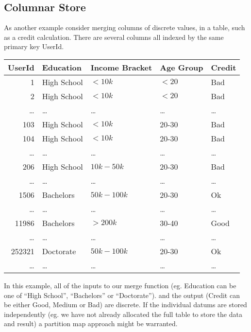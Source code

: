 \documentclass{article}
\begin{document}
\subsection{Columnar Store}

As another example consider merging columns of discrete values,
in a table,
such as a credit calculation.
There are several columns all indexed by the same primary key UserId.
\begin{center}
\begin{tabular}{|r|l|l|l|l|}
\hline
  UserId & Education   & Income Bracket & Age Group & Credit \\
\hline
  1      & High School & $<10k$       & $< 20$  & Bad    \\
  2      & High School & $<10k$       & $< 20$  & Bad    \\
  \ldots & \ldots      & \dots        & \ldots  & \ldots \\
  103    & High School & $<10k$       & 20-30   & Bad    \\
  104    & High School & $<10k$       & 20-30   & Bad    \\
  \ldots & \ldots      & \dots        & \ldots  & \ldots \\
  206    & High School & $10k-50k$    & 20-30   & Bad    \\
  \ldots & \ldots      & \dots        & \ldots  & \ldots \\
  1506   & Bachelors   & $50k-100k$   & 20-30   & Ok     \\
  \ldots & \ldots      & \dots        & \ldots  & \ldots \\
  11986  & Bachelors   & $>200k$      & 30-40   & Good \\
  \ldots & \ldots      & \dots        & \ldots  & \ldots \\
  252321 & Doctorate   & $50k-100k$   & 20-30   & Ok \\
  \ldots & \ldots      & \dots        & \ldots  & \ldots \\
  \hline
\end{tabular}
\end{center}
In this example, all of the inputs to our merge function
(eg. Education can be one of ``High School'', ``Bachelors''
or ``Doctorate'').
and the output (Credit can be either Good, Medium or Bad)
are discrete.
If the individual datums are stored independently (eg. we have not
already allocated the full table to store the data and result) a
partition map approach might be warranted.
\end{document}
